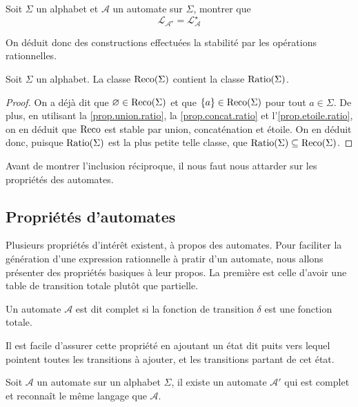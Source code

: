 \begin{exercise}\label{prop.etoile.ratio}
  Soit $\Sigma$ un alphabet et $\mathcal A$ un automate sur $\Sigma$, montrer
  que
  \[\mathcal L_{\mathcal A^\star} = \mathcal L_{\mathcal A}^\star\]
\end{exercise}

On déduit donc des constructions effectuées la stabilité par les opérations
rationnelles.

\begin{corollary}
  Soit $\Sigma$ un alphabet. La classe $\operatorname{Reco}(\Sigma)$ contient la classe
  $\operatorname{Ratio}(\Sigma)$.
\end{corollary}

\begin{proof}
  On a déjà dit que $\varnothing \in \operatorname{Reco}(\Sigma)$ et que
  $\{a\}\in \operatorname{Reco}(\Sigma)$ pour tout $a \in \Sigma$. De plus, en utilisant la
  \cref{prop.union.ratio}, la \cref{prop.concat.ratio} et
  l'\cref{prop.etoile.ratio}, on en déduit que $\operatorname{Reco}$ est stable par union,
  concaténation et étoile. On en déduit donc, puisque $\operatorname{Ratio}(\Sigma)$ est la
  plus petite telle classe, que $\operatorname{Ratio}(\Sigma)\subseteq\operatorname{Reco}(\Sigma)$.
\end{proof}

Avant de montrer l'inclusion réciproque, il nous faut nous attarder sur les
propriétés des automates.

\subsection{Propriétés d'automates}

Plusieurs propriétés d'intérêt existent, à propos des automates. Pour faciliter
la génération d'une expression rationnelle à pratir d'un automate, nous allons
présenter des propriétés basiques à leur propos. La première est celle
d'avoir une table de transition totale plutôt que partielle.

\begin{definition}
  Un automate $\mathcal A$ est dit complet si la fonction de transition $\delta$
  est une fonction totale.
\end{definition}

Il est facile d'assurer cette propriété en ajoutant un état dit \og puits\fg
vers lequel pointent toutes les transitions à ajouter, et les transitions
partant de cet état.

\begin{proposition}
  Soit $\mathcal A$ un automate sur un alphabet $\Sigma$, il existe un automate
  $\mathcal A'$ qui est complet et reconnaît le même langage que $\mathcal A$.
\end{proposition}

